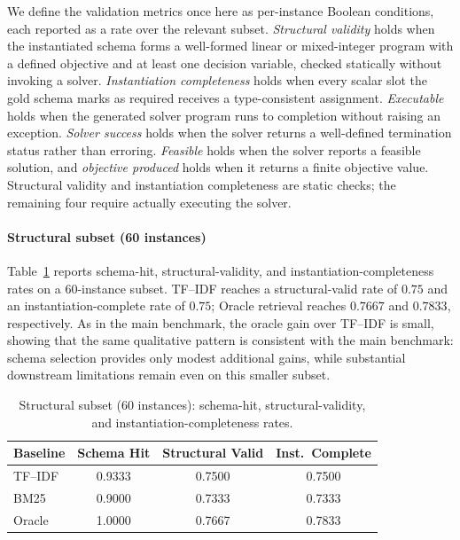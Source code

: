 \documentclass[pdflatex,sn-basic,Numbered]{sn-jnl}
\begin{document}
We define the validation metrics once here as per-instance Boolean conditions, each reported as a rate over the relevant subset. \emph{Structural validity} holds when the instantiated schema forms a well-formed linear or mixed-integer program with a defined objective and at least one decision variable, checked statically without invoking a solver. \emph{Instantiation completeness} holds when every scalar slot the gold schema marks as required receives a type-consistent assignment. \emph{Executable} holds when the generated solver program runs to completion without raising an exception. \emph{Solver success} holds when the solver returns a well-defined termination status rather than erroring. \emph{Feasible} holds when the solver reports a feasible solution, and \emph{objective produced} holds when it returns a finite objective value. Structural validity and instantiation completeness are static checks; the remaining four require actually executing the solver.

\paragraph{Structural subset (60 instances)} Table~\ref{tab:eng-structural} reports schema-hit, structural-validity, and instantiation-completeness rates on a 60-instance subset. TF--IDF reaches a structural-valid rate of $0.75$ and an instantiation-complete rate of $0.75$; Oracle retrieval reaches $0.7667$ and $0.7833$, respectively. As in the main benchmark, the oracle gain over TF--IDF is small, showing that the same qualitative pattern is consistent with the main benchmark: schema selection provides only modest additional gains, while substantial downstream limitations remain even on this smaller subset.

\begin{table}[t]
\centering
\caption{Structural subset (60 instances): schema-hit, structural-validity, and instantiation-completeness rates.}
\label{tab:eng-structural}
\small
\begin{tabular}{lccc}
  \toprule
  Baseline & Schema Hit & Structural Valid & Inst.\ Complete \\
  \midrule
  TF--IDF & 0.9333 & 0.7500 & 0.7500 \\
  BM25    & 0.9000 & 0.7333 & 0.7333 \\
  Oracle  & 1.0000 & 0.7667 & 0.7833 \\
  \bottomrule
\end{tabular}
\end{table}
\end{document}
